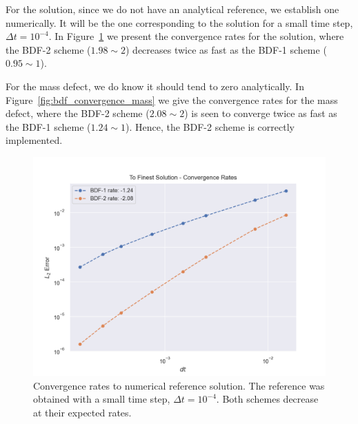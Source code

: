 \documentclass[../../thesis.tex]{subfiles}
\begin{document}
For the solution, since we do not have an analytical reference, 
we establish one numerically.
It will be the one corresponding to the solution for a small time step, 
$\Delta t = 10^{-4}$.
In Figure~\ref{fig:bdf_convergence_solutions} we present the convergence rates for the solution,
where the BDF-2 scheme ($1.98 \sim 2$) decreases twice as fast as the BDF-1 scheme ($0.95 \sim 1$).

For the mass defect, we do know it should tend to zero analytically.
In Figure~\ref{fig:bdf_convergence_mass} we give the convergence rates for the mass defect,
where the BDF-2 scheme ($2.08 \sim 2$) is seen to converge 
twice as fast as the BDF-1 scheme ($1.24 \sim 1$).
Hence, the BDF-2 scheme is correctly implemented.
\begin{figure}[h]
    \centering
    \includegraphics[width=1\columnwidth]{research_project/piston/figures/bdf_convergence/convergence_finest_solution.png}
    \caption{Convergence rates to numerical reference solution.
    The reference was obtained with a small time step, $\Delta t = 10^{-4}$.
    Both schemes decrease at their expected rates.}
    \label{fig:bdf_convergence_solutions}
\end{figure}
\end{document}
